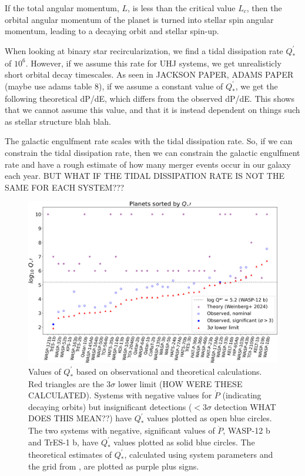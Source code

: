 \documentclass[oneside,12pt]{amsart}
\numberwithin{page}{section}
\begin{document}
If the total angular momentum, $L$, is less than the critical value $L_c$, then the orbital angular momentum of the planet is turned into stellar spin angular momentum, leading to a decaying orbit and stellar spin-up. 

When looking at binary star recircularization, we find a tidal dissipation rate $Q^{'}_{*}$ of $10^6$. However, if we assume this rate for UHJ systems, we get unrealisticly short orbital decay timescales. As seen in JACKSON PAPER, ADAMS PAPER (maybe use adams table 8), if we assume a constant value of $Q^{'}_{*}$, we get the following theoretical dP/dE, which differs from the observed dP/dE. This shows that we cannot assume this value, and that it is instead dependent on things such as stellar structure blah blah. 

The galactic engulfment rate scales with the tidal dissipation rate. So, if we can constrain the tidal dissipation rate, then we can constrain the galactic engulfment rate and have a rough estimate of how many merger events occur in our galaxy each year. BUT WHAT IF THE TIDAL DISSIPATION RATE IS NOT THE SAME FOR EACH SYSTEM??? 

\begin{figure}[htbp]
    \centering
    \includegraphics[width=0.85\linewidth]{figs/adams_fig11.jpg}
    \caption{Values of $Q^{'}_*$ based on observational and theoretical calculations. Red triangles are the $3\sigma$ lower limit (HOW WERE THESE CALCULATED). Systems with negative values for $\dot{P}$ (indicating decaying orbits) but insignificant detections ($<3\sigma$ detection WHAT DOES THIS MEAN??) have $Q^{'}_*$ values plotted as open blue circles. The two systems with negative, significant values of $\dot{P}$, WASP-12 b and TrES-1 b, have $Q^{'}_*$ values plotted as solid blue circles. The theoretical estimates of $Q^{'}_*$, calculated using system parameters and the grid from \citet{weinberg2023orbital}, are plotted as purple plus signs.}
    \label{fig:adams-fig11}
\end{figure}
\end{document}
